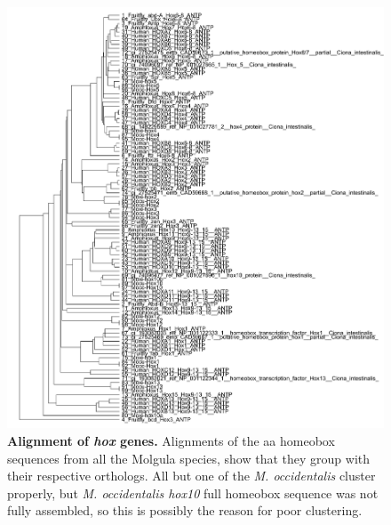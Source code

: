 \begin{figure}[tbp]
\centering
\includegraphics[scale=0.85]{figures/hox_alignment.pdf}
\caption{\textbf{Alignment of \textit{hox} genes.} Alignments of the aa homeobox sequences from all the Molgula species, show that they group with their respective orthologs. All but one of the \textit{M. occidentalis} cluster properly, but \textit{M. occidentalis hox10} full homeobox sequence was not fully assembled, so this is possibly the reason for poor clustering. }
\label{fig:hox-alignments}
\end{figure}

